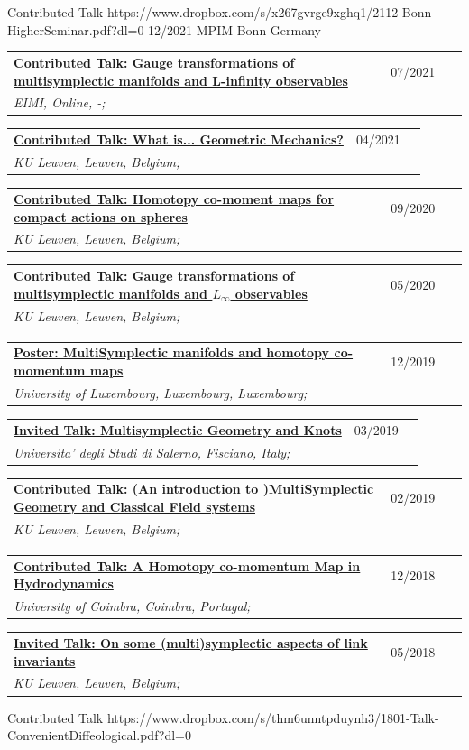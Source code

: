 \documentclass[a4paper]{article}
\newcommand{\longvoice}[8]{
	\begin{tabular}{p{0.83\linewidth} p{0.17\linewidth} }
		\textbf{\href{#3}{#2: #1}} & #4 
		\\ 
		\textit{#5, #6, #7;} & {\small\emph{#8}}
	\end{tabular}
	\vspace{.5em}
}
\begin{document}
		{Contributed Talk}
		{https://www.dropbox.com/s/x267gvrge9xghq1/2112-Bonn-HigherSeminar.pdf?dl=0}
		{12/2021}
		{MPIM}
		{Bonn}
		{Germany}
		{}
	\longvoice{Gauge transformations of multisymplectic manifolds and L-infinity observables}
		{Contributed Talk}
		{https://www.researchgate.net/publication/353463068_Gauge_transformations_of_multisymplectic_manifolds_and_L_observables}
		{07/2021}
		{EIMI}
		{Online}
		{-}
		{}
	\longvoice{What is... Geometric Mechanics?}
		{Contributed Talk}
		{https://wis.kuleuven.be/agenda/PhdColloquia/ay20-21/copy4_of_PhD-coll-Molag}
		{04/2021}
		{KU Leuven}
		{Leuven}
		{Belgium}
		{}
	\longvoice{Homotopy co-moment maps for compact actions on spheres}
		{Contributed Talk}
		{https://www.researchgate.net/publication/344220375_Homotopy_co-moment_maps_for_compact_actions_on_spheres}
		{09/2020}
		{KU Leuven}
		{Leuven}
		{Belgium}
		{}
	\longvoice{Gauge transformations of multisymplectic manifolds and $L_\infty$ observables}
		{Contributed Talk}
		{https://www.researchgate.net/publication/344044689_Gauge_transformations_of_multisymplectic_manifolds_and_L_infinity_observables}
		{05/2020}
		{KU Leuven}
		{Leuven}
		{Belgium}
		{}
	\longvoice{MultiSymplectic manifolds and homotopy co-momentum maps}
		{Poster}
		{https://www.researchgate.net/publication/338019063_Multisymplectic_manifolds_and_Homotopy_co-momentum_maps}
		{12/2019}
		{University of Luxembourg}
		{Luxembourg}
		{Luxembourg}
		{}
	\longvoice{Multisymplectic Geometry and Knots}
		{Invited Talk}
		{https://www.researchgate.net/publication/331939491_Multisymplectic_aspects_of_link_invariants}
		{03/2019}
		{Universita' degli Studi di Salerno}
		{Fisciano}
		{Italy}
		{}
	\longvoice{(An introduction to )MultiSymplectic Geometry and Classical Field systems}
		{Contributed Talk}
		{https://www.dropbox.com/s/q68uv6hbbej8d09/1902-Talk-MultisymplecticFields.pdf?dl=0}
		{02/2019}
		{KU Leuven}
		{Leuven}
		{Belgium}
		{}
	\longvoice{A Homotopy co-momentum Map in Hydrodynamics}
		{Contributed Talk}
		{https://www.researchgate.net/publication/329572409_Homotopy_co-momentum_Map_in_Hydrodynamics}
		{12/2018}
		{University of Coimbra}
		{Coimbra}
		{Portugal}
		{}
	\longvoice{On some (multi)symplectic aspects of link invariants}
		{Invited Talk}
		{https://web.archive.org/web/20180424133109/https://wis.kuleuven.be/agenda/sem-geometry/academic-year-2017-2018/seminar_differential_geometry_Miti}
		{05/2018}
		{KU Leuven}
		{Leuven}
		{Belgium}
		{}
		{Contributed Talk}
		{https://www.dropbox.com/s/thm6unntpduynh3/1801-Talk-ConvenientDiffeological.pdf?dl=0}
\end{document}
